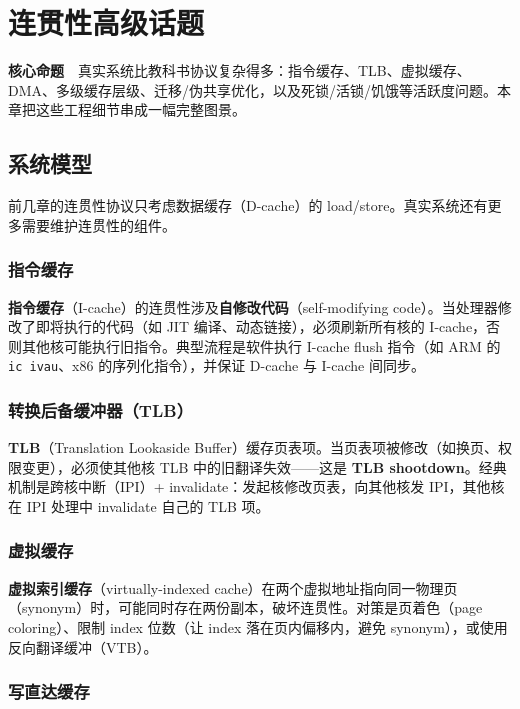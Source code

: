 \chapter{连贯性高级话题}

\begin{epigraph}
\textbf{核心命题}　真实系统比教科书协议复杂得多：指令缓存、TLB、虚拟缓存、DMA、多级缓存层级、迁移/伪共享优化，以及死锁/活锁/饥饿等活跃度问题。本章把这些工程细节串成一幅完整图景。
\end{epigraph}



\section{系统模型}

前几章的连贯性协议只考虑数据缓存（D-cache）的 load/store。真实系统还有更多需要维护连贯性的组件。

\subsection{指令缓存}

\textbf{指令缓存}（I-cache）的连贯性涉及\textbf{自修改代码}（self-modifying code）。当处理器修改了即将执行的代码（如 JIT 编译、动态链接），必须刷新所有核的 I-cache，否则其他核可能执行旧指令。典型流程是软件执行 I-cache flush 指令（如 ARM 的 \texttt{ic ivau}、x86 的序列化指令），并保证 D-cache 与 I-cache 间同步。

\subsection{转换后备缓冲器（TLB）}

\textbf{TLB}（Translation Lookaside Buffer）缓存页表项。当页表项被修改（如换页、权限变更），必须使其他核 TLB 中的旧翻译失效——这是 \textbf{TLB shootdown}。经典机制是跨核中断（IPI）+ invalidate：发起核修改页表，向其他核发 IPI，其他核在 IPI 处理中 invalidate 自己的 TLB 项。

\subsection{虚拟缓存}

\textbf{虚拟索引缓存}（virtually-indexed cache）在两个虚拟地址指向同一物理页（synonym）时，可能同时存在两份副本，破坏连贯性。对策是页着色（page coloring）、限制 index 位数（让 index 落在页内偏移内，避免 synonym），或使用反向翻译缓冲（VTB）。

\subsection{写直达缓存}


